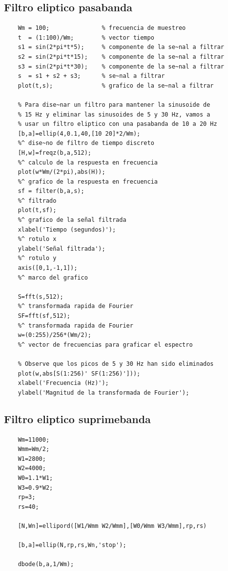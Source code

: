 \subsection{Filtro eliptico pasabanda}

\begin{verbatim}
	Wm = 100;               % frecuencia de muestreo
	t  = (1:100)/Wm;        % vector tiempo    
	s1 = sin(2*pi*t*5);     % componente de la se~nal a filtrar
	s2 = sin(2*pi*t*15);    % componente de la se~nal a filtrar
	s3 = sin(2*pi*t*30);    % componente de la se~nal a filtrar
	s  = s1 + s2 + s3;      % se~nal a filtrar
	plot(t,s);              % grafico de la se~nal a filtrar
	
	% Para dise~nar un filtro para mantener la sinusoide de 
	% 15 Hz y eliminar las sinusoides de 5 y 30 Hz, vamos a 
	% usar un filtro eliptico con una pasabanda de 10 a 20 Hz
	[b,a]=ellip(4,0.1,40,[10 20]*2/Wm); 
	%^ dise~no de filtro de tiempo discreto
	[H,w]=freqz(b,a,512);               
	%^ calculo de la respuesta en frecuencia
	plot(w*Wm/(2*pi),abs(H));           
	%^ grafico de la respuesta en frecuencia
	sf = filter(b,a,s);                 
	%^ filtrado
	plot(t,sf);                         
	%^ grafico de la señal filtrada
	xlabel('Tiempo (segundos)');        
	%^ rotulo x
	ylabel('Señal filtrada');           
	%^ rotulo y
	axis([0,1,-1,1]);                   
	%^ marco del grafico
	
	S=fft(s,512);                       
	%^ transformada rapida de Fourier
	SF=fft(sf,512);                     
	%^ transformada rapida de Fourier
	w=(0:255)/256*(Wm/2);               
	%^ vector de frecuencias para graficar el espectro
	
	% Observe que los picos de 5 y 30 Hz han sido eliminados
	plot(w,abs[S(1:256)' SF(1:256)']));
	xlabel('Frecuencia (Hz)');
	ylabel('Magnitud de la transformada de Fourier'); 
\end{verbatim}

\subsection{Filtro eliptico suprimebanda}

\begin{verbatim}
	Wm=11000;
	Wmm=Wm/2;
	W1=2800;
	W2=4000;
	W0=1.1*W1;
	W3=0.9*W2;
	rp=3;
	rs=40;
	
	[N,Wn]=ellipord([W1/Wmm W2/Wmm],[W0/Wmm W3/Wmm],rp,rs)
	
	[b,a]=ellip(N,rp,rs,Wn,'stop');
	
	dbode(b,a,1/Wm);
	
\end{verbatim}

